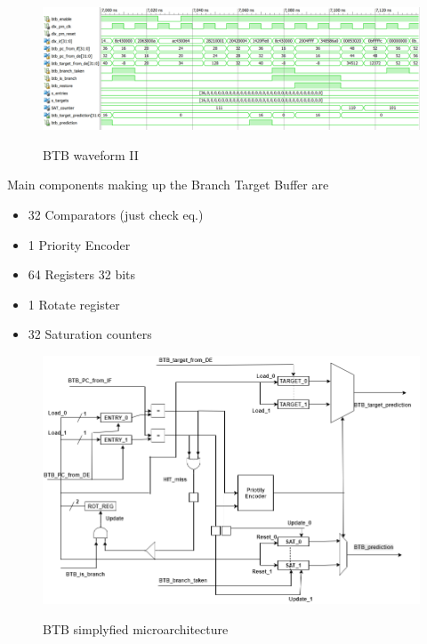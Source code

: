 \begin{figure}[H]
\centering
\includegraphics[scale=.4]{Immagini/10}
\label{10}
\caption{BTB waveform II}
\end{figure}
Main components making up the Branch Target Buffer are
\begin{itemize}
\item 32 Comparators (just check eq.)
\item 1 Priority Encoder
\item 64 Registers 32 bits
\item 1 Rotate register
\item 32 Saturation counters
\end{itemize}
\begin{figure}[H]
\centering
\includegraphics[scale=.5]{Immagini/11}
\label{11}
\caption{BTB simplyfied microarchitecture}
\end{figure}

